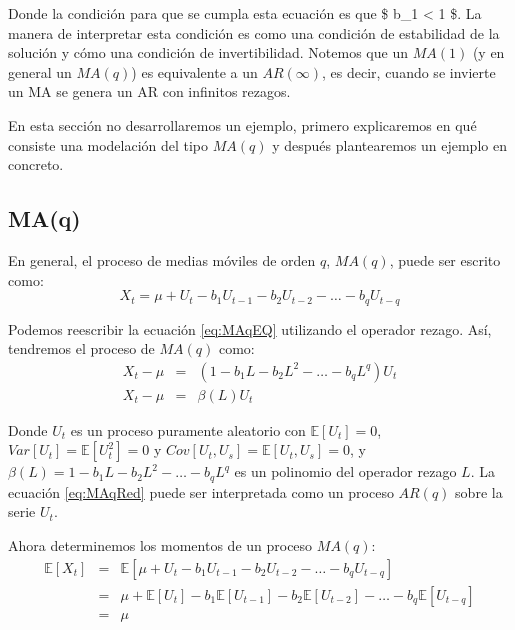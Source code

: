 \documentclass[
]{book}
\begin{document}
Donde la condición para que se cumpla esta ecuación es que \$ \textbar{} b\_1 \textbar{} \textless{} 1 \$. La manera de interpretar esta condición es como una condición de estabilidad de la solución y cómo una condición de invertibilidad. Notemos que un \(MA(1)\) (y en general un \(MA(q)\)) es equivalente a un \(AR(\infty)\), es decir, cuando se invierte un MA se genera un AR con infinitos rezagos.

En esta sección no desarrollaremos un ejemplo, primero explicaremos en qué consiste una modelación del tipo \(MA(q)\) y después plantearemos un ejemplo en concreto.

\hypertarget{maq}{%
\subsection{MA(q)}\label{maq}}

En general, el proceso de medias móviles de orden \(q\), \(MA(q)\), puede ser escrito como:
\begin{equation}
    X_t = \mu + U_t - b_1 U_{t-1} - b_2 U_{t-2} - \ldots - b_q U_{t-q}
    \label{eq:MAqEQ}
\end{equation}

Podemos reescribir la ecuación \eqref{eq:MAqEQ} utilizando el operador rezago. Así, tendremos el proceso de \(MA(q)\) como:
\begin{eqnarray}
    X_t - \mu & = & (1 - b_1 L - b_2 L^2 - \ldots - b_q L^q) U_{t} \nonumber \\
    X_t - \mu & = & \beta(L) U_t
    \label{eq:MAqRed}
\end{eqnarray}

Donde \(U_t\) es un proceso puramente aleatorio con \(\mathbb{E}[U_t] = 0\), \(Var[U_t] = \mathbb{E}[U_t^2] = 0\) y \(Cov[U_t, U_s] = \mathbb{E}[U_t, U_s] = 0\), y \(\beta(L) = 1 - b_1 L - b_2 L^2 - \ldots - b_q L^q\) es un polinomio del operador rezago \(L\). La ecuación \eqref{eq:MAqRed} puede ser interpretada como un proceso \(AR(q)\) sobre la serie \(U_t\).

Ahora determinemos los momentos de un proceso \(MA(q)\):
\begin{eqnarray}
    \mathbb{E}[X_t] & = & \mathbb{E}[\mu + U_t - b_1 U_{t-1} - b_2 U_{t-2} - \ldots - b_q U_{t-q}] \nonumber \\
    & = & \mu + \mathbb{E}[U_t] - b_1 \mathbb{E}[U_{t-1}] - b_2 \mathbb{E}[U_{t-2}] - \ldots - b_q \mathbb{E}[U_{t-q}] \nonumber \\
    & = & \mu
\end{eqnarray}
\end{document}
